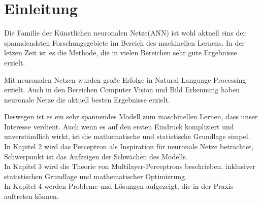 \section{Einleitung}
Die Familie der Künstlichen neuronalen Netze(ANN) ist wohl aktuell eins der spanndendsten Forschungsgebiete im Bereich des machinellen Lernens. In der letzen Zeit ist es die Methode, die in vielen Bereichen sehr gute Ergebnisse erzielt. 

Mit neuronalen Netzen wurden große Erfolge in Natural Language Processing erzielt. Auch in den Bereichen Computer Vision und Bild Erkennung haben neuronale Netze die aktuell besten Ergebnisse erzielt\cite{LeCun2015}.

Deswegen ist es ein sehr spannendes Modell zum maschinellen Lernen, dass unser Interesse verdient. Auch wenn es auf den ersten Eindruck kompliziert und unverständlich wirkt, ist die mathematische und statistische Grundlage simpel.\\
In Kapitel 2 wird das Perceptron als Inspiration für neuronale Netze betrachtet, Schwerpunkt ist das Aufzeigen der Schwächen des Modells. \\
In Kapitel 3 wird die Theorie von Multilayer-Perceptrons beschrieben, inklusiver statistischen Grundlage und mathematischer Optimierung. \\
In Kapitel 4 werden Probleme und Lösungen aufgezeigt, die in der Praxis auftreten können.
